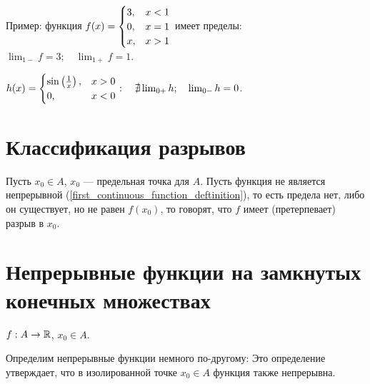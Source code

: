 \documentclass[a4paper]{report}
\begin{document}
    Пример: функция $f(x) = \begin{cases}3,&x < 1 \\ 0,&x = 1\\ x,&x > 1\end{cases}$ имеет пределы: $\lim_{1-}f = 3; \quad \lim_{1+}f = 1$.

    $h(x) = \begin{cases}\sin\left(\frac{1}{x}\right),&x > 0 \\ 0,& x < 0\end{cases}: \quad \nexists \lim_{0+}h; \quad  \lim_{0-}h = 0$.




    \section{Классификация разрывов}
    Пусть $x_0 \in A$, $x_0$ --- предельная точка для $A$.
    Пусть функция не является непрерывной (\cref{first_continuous_function_deftinition}), то есть предела нет, либо он существует, но не равен $f(x_0)$, то говорят, что $f$ имеет (претерпевает) разрыв в $x_0$.


    \section{Непрерывные функции на замкнутых конечных множествах}
    $f: A \rightarrow \mathbb{R}$, $x_0 \in A$.

    Определим непрерывные функции немного по-другому:
    Это определение утверждает, что в изолированной точке $x_0 \in A$ функция также непрерывна.
\end{document}
